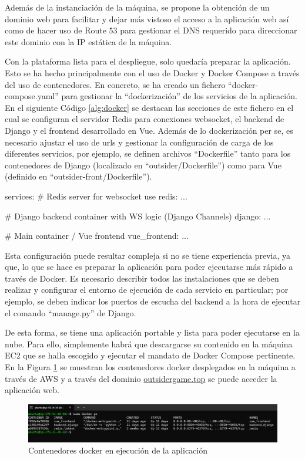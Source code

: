 Además de la instanciación de la máquina, se propone la obtención de un dominio web para facilitar y dejar más vistoso el acceso a la aplicación
web así como de hacer uso de Route 53 para gestionar el DNS requerido para direccionar este dominio con la IP estática de la máquina. 

Con la plataforma lista para el despliegue, solo quedaría preparar la aplicación. Esto se ha hecho principalmente con el uso de Docker y Docker Compose a través
del uso de contenedores. En concreto, se ha creado un fichero ``docker-compose.yaml'' para gestionar 
la ``dockerización'' de los servicios de la aplicación. En el siguiente Código \ref{alg:docker} se destacan las secciones de este
fichero en el cual se configuran el servidor Redis para conexiones websocket, el backend de Django y el frontend
desarrollado en Vue. Además de lo dockerización per se, es necesario ajustar el uso de urls y gestionar la configuración
de carga de los diferentes servicios, por ejemplo, se definen archivos ``Dockerfile'' tanto para los contenedores
de Django (localizado en ``outsider/Dockerfile'') como para Vue (definido en ``outsider-front/Dockerfile'').

\begin{mypython}[float={h},caption={Estructura del fichero Docker Compose},label={alg:docker}]
	services:
		# Redis server for websocket use
		redis: ...
		
		# Django backend container with WS logic (Django Channels)
		django: ...
	  	
		# Main container / Vue frontend
		vue_frontend: ...
\end{mypython}

Esta configuración puede resultar compleja si no se tiene experiencia previa, ya que, lo que se hace es preparar
la aplicación para poder ejecutarse más rápido a través de Docker. Es necesario describir todos las 
instalaciones que se deben realizar y configurar el entorno de ejecución de cada servicio en particular; por ejemplo,
se deben indicar los puertos de escucha del backend a la hora de ejecutar el comando ``manage.py'' de Django.

De esta forma, se tiene una aplicación portable y lista para poder ejecutarse en la nube. Para ello, simplemente 
habrá que descargarse su contenido en la máquina EC2 que se halla escogido y ejecutar el mandato de Docker Compose pertinente. En la
Figura \ref{fig:res_amazon} se muestran los contenedores docker desplegados en la máquina a través de AWS y a través del dominio 
\href{http://outsidergame.top/}{outsidergame.top} se puede acceder la aplicación web.

\begin{figure}[h]
	\centering
	\includegraphics[width=\textwidth,clip=true]{res_amazon.png}
	\caption{Contenedores docker en ejecución de la aplicación}
	\label{fig:res_amazon}
\end{figure}
